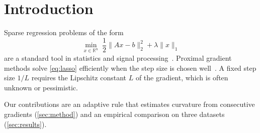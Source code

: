 \section{Introduction}
\label{sec:intro}

Sparse regression problems of the form
\begin{equation}
  \min_{x \in \mathbb{R}^n} \; \frac{1}{2}\lVert Ax - b \rVert_2^2 + \lambda \lVert x \rVert_1
  \label{eq:lasso}
\end{equation}
are a standard tool in statistics and signal processing~\citep{tibshirani1996}.
Proximal gradient methods solve \eqref{eq:lasso} efficiently when the step size
is chosen well~\citep{beck2009}. A fixed step size $1/L$ requires the Lipschitz
constant $L$ of the gradient, which is often unknown or pessimistic.

Our contributions are an adaptive rule that estimates curvature from
consecutive gradients (\cref{sec:method}) and an empirical comparison on three
datasets (\cref{sec:results}).
